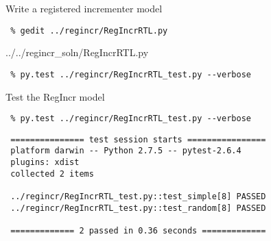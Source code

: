 \begin{task}\begin{frame}[fragile]{Write a registered incrementer model}

\vspace{-0.15in}
\begin{Verbatim}[commandchars=\\\{\}]
 % cd \midtilde/pymtl-tut/build
 % gedit ../regincr/RegIncrRTL.py
\end{Verbatim}
\vspace{-0.2in}

%
{../../regincr_soln/RegIncrRTL.py}

\vspace{-0.22in}
\begin{Verbatim}
 % py.test ../regincr/RegIncrRTL_test.py --verbose
\end{Verbatim}

\vspace{-2.5in}\hspace*{2.4in}

\end{frame}
\end{task}

\begin{task}\begin{frame}[fragile]{Test the RegIncr model}

\vspace{-0.15in}
\begin{Verbatim}[commandchars=\\\{\}]
 % cd \midtilde/pymtl-tut/build
 % py.test ../regincr/RegIncrRTL_test.py --verbose
\end{Verbatim}
\smallskip
\begin{Verbatim}
 =============== test session starts ================
 platform darwin -- Python 2.7.5 -- pytest-2.6.4
 plugins: xdist
 collected 2 items

 ../regincr/RegIncrRTL_test.py::test_simple[8] PASSED
 ../regincr/RegIncrRTL_test.py::test_random[8] PASSED

 ============= 2 passed in 0.36 seconds =============
\end{Verbatim}

\end{frame}
\end{task}

